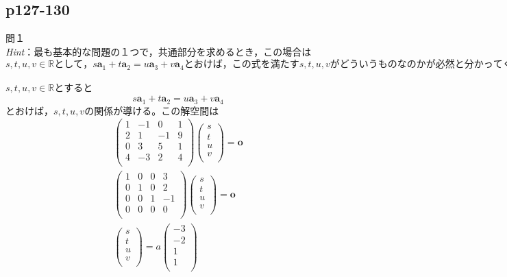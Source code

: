 \documentclass[dvipdfmx,uplatex,11pt]{jsarticle}
\begin{document}
\subsection{p127-130}
\noindent
問１
\noindent \\
\textsl{Hint}：最も基本的な問題の１つで，共通部分を求めるとき，この場合は$s,t,u,v \in \mathbb{R}として，s\bm{a}_1+t\bm{a}_2=u\bm{a}_3+v\bm{a}_4 とおけば，この式を満たすs,t,u,vがどういうものなのかが必然と分かってくる。なお，問題にされていないが和空間の基底を求める場合は，\bm{a}_1,\bm{a}_2,\bm{a}_3,\bm{a}_4から線型独立になるようなベクトルの組を求めればいい。$\\
\dotfill \\
$s,t,u,v \in \mathbb{R}とすると$
\begin{eqnarray*}
s\bm{a}_1+t\bm{a}_2=u\bm{a}_3+v\bm{a}_4
\end{eqnarray*}
$とおけば，s,t,u,vの関係が導ける。この解空間は$
\begin{eqnarray*}
\begin{pmatrix}
1 & -1 & 0 & 1 \\
2 & 1 & -1 & 9 \\
0 & 3 & 5 & 1 \\
4 & -3 & 2 & 4 \\
\end{pmatrix}
\begin{pmatrix}
s \\
t \\
u \\
v \\
\end{pmatrix}
=\bm{o} \\
\begin{pmatrix}
1 & 0 & 0 & 3 \\
0 & 1 & 0 & 2 \\
0 & 0 & 1 & -1 \\
0 & 0 & 0 & 0 \\
\end{pmatrix}
\begin{pmatrix}
s \\
t \\
u \\
v \\
\end{pmatrix}
=\bm{o} \\
\begin{pmatrix}
s \\
t \\
u \\
v \\
\end{pmatrix}
=a
\begin{pmatrix}
-3 \\
-2 \\
1 \\
1 \\
\end{pmatrix}
\end{eqnarray*}
\end{document}

